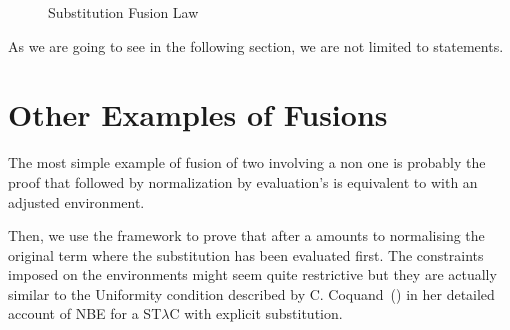 \begin{figure}[h]
\caption{Substitution Fusion Law\label{fig:subsub}}
\end{figure}

As we are going to see in the following section, we are not limited
to  statements.

\section{Other Examples of Fusions}

The most simple example of fusion of two  involving a non 
one is probably the proof that  followed by normalization by evaluation's
 is equivalent to  with an adjusted environment.





Then, we use the framework to prove that  after a 
amounts to normalising the original term where the substitution has been
evaluated first. The constraints imposed on the environments might seem
quite restrictive but they are actually similar to the Uniformity condition
described by C. Coquand~(\citeyear{coquand2002formalised}) in her detailed
account of NBE for a ST$λ$C with explicit substitution.
